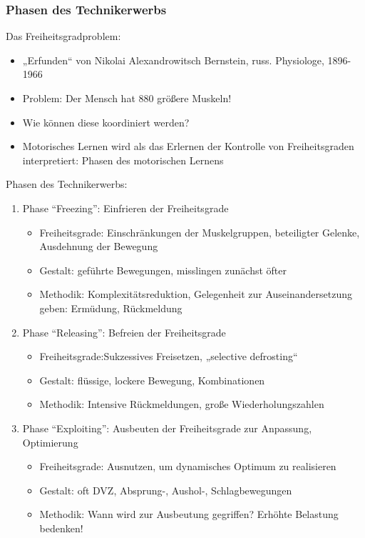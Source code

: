 \subsubsection*{Phasen des Technikerwerbs}

Das Freiheitsgradproblem:
\begin{itemize}
    \item „Erfunden“ von Nikolai Alexandrowitsch Bernstein, russ. Physiologe, 1896-1966
    \item Problem: Der Mensch hat 880 größere Muskeln!
    \item Wie können diese koordiniert werden?
    \item Motorisches Lernen wird als das Erlernen der Kontrolle von Freiheitsgraden interpretiert: Phasen des motorischen Lernens
\end{itemize}

Phasen des Technikerwerbs:
\begin{enumerate}
    \item Phase ``Freezing'': Einfrieren der Freiheitsgrade
    \begin{itemize}
        \item Freiheitsgrade: Einschränkungen der Muskelgruppen, beteiligter Gelenke, Ausdehnung der Bewegung
        \item Gestalt: geführte Bewegungen, misslingen zunächst öfter
        \item Methodik: Komplexitätsreduktion, Gelegenheit zur Auseinandersetzung geben: Ermüdung, Rückmeldung
    \end{itemize}
    \item Phase ``Releasing'': Befreien der Freiheitsgrade
    \begin{itemize}
        \item Freiheitsgrade:Sukzessives Freisetzen, „selective defrosting“
        \item Gestalt: flüssige, lockere Bewegung, Kombinationen
        \item Methodik: Intensive Rückmeldungen, große Wiederholungszahlen
    \end{itemize}
    \item Phase ``Exploiting'': Ausbeuten der Freiheitsgrade zur Anpassung, Optimierung
    \begin{itemize}
        \item Freiheitsgrade: Ausnutzen, um dynamisches Optimum zu realisieren
        \item Gestalt: oft DVZ, Absprung-, Aushol-, Schlagbewegungen
        \item Methodik: Wann wird zur Ausbeutung gegriffen? Erhöhte Belastung bedenken!
    \end{itemize}
\end{enumerate}

